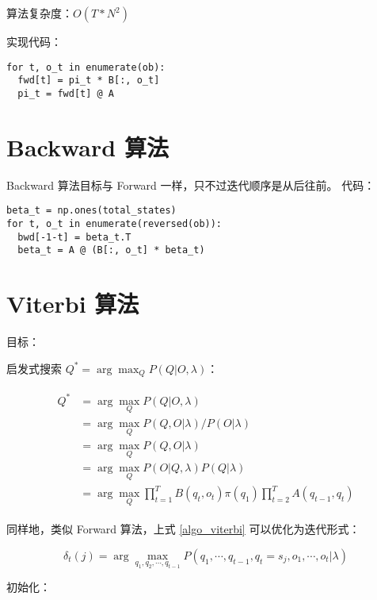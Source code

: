 \documentclass[degree=project, degree-type=project]{thuthesis}
\begin{document}
  算法复杂度：$O(T * N^2)$

  实现代码：

  \begin{verbatim}
for t, o_t in enumerate(ob):
  fwd[t] = pi_t * B[:, o_t]
  pi_t = fwd[t] @ A
  \end{verbatim}


\section{Backward 算法}

Backward 算法目标与 Forward 一样，只不过迭代顺序是从后往前。
代码：

  \begin{verbatim}
beta_t = np.ones(total_states)
for t, o_t in enumerate(reversed(ob)):
  bwd[-1-t] = beta_t.T
  beta_t = A @ (B[:, o_t] * beta_t)
  \end{verbatim}

\section{Viterbi 算法}

目标：

启发式搜索 $Q^* = \arg \max_Q P(Q | O, \lambda)$：

\begin{align}
  \begin{split}
    Q^* &= \arg \max_Q P(Q | O, \lambda) \\
    &= \arg \max_Q P(Q, O | \lambda) / P(O | \lambda) \\
    &= \arg \max_Q P(Q, O | \lambda) \\
    &= \arg \max_Q P(O | Q, \lambda) P(Q | \lambda) \\
    &= \arg \max_Q \prod_{t=1}^T B(q_t, o_t) \pi(q_1) \prod_{t=2}^T A(q_{t-1}, q_t)
  \end{split}
  \label{algo_viterbi}
\end{align}

同样地，类似 Forward 算法，上式 \ref{algo_viterbi} 可以优化为迭代形式：

\begin{equation}
\delta_t (j) = \arg \max_{q_1, q_2, \cdots, q_{t-1}} P(q_1, \cdots, q_{t-1}, q_t=s_j, o_1, \cdots, o_t | \lambda)
\end{equation}

初始化：
\end{document}
